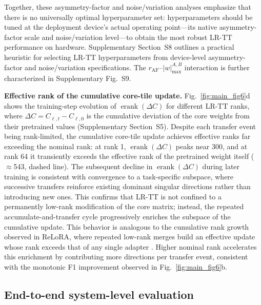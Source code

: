 \documentclass[fleqn,10pt]{wlscirep}
\newcommand{\erank}{\operatorname{erank}}
\begin{document}
Together, these asymmetry-factor and noise/variation analyses emphasize that there is no universally optimal hyperparameter set: hyperparameters should be tuned at the deployment device's actual operating point---its native asymmetry-factor scale and noise/variation level---to obtain the most robust LR-TT performance on hardware.
Supplementary Section~S8 outlines a practical heuristic for selecting LR-TT hyperparameters from device-level asymmetry-factor and noise/variation specifications.
The \(r_{\mathrm{AF}}\)--\(|w|_{\max}^{A,B}\) interaction is further characterized in Supplementary Fig.~S9.

\noindent
\textbf{Effective rank of the cumulative core-tile update.}
Fig.~\ref{fig:main_fig6}d shows the training-step evolution of \(\erank(\Delta C)\) for different LR-TT ranks, where \(\Delta C = C_{\ell,t}-C_{\ell,0}\) is the cumulative deviation of the core weights from their pretrained values (Supplementary Section~S5). Despite each transfer event being rank-limited, the cumulative core-tile update achieves effective ranks far exceeding the nominal rank: at rank 1, \(\erank(\Delta C)\) peaks near 300, and at rank 64 it transiently exceeds the effective rank of the pretrained weight itself (\(\approx\)543, dashed line). The subsequent decline in \(\erank(\Delta C)\) during later training is consistent with convergence to a task-specific subspace, where successive transfers reinforce existing dominant singular directions rather than introducing new ones. This confirms that LR-TT is not confined to a permanently low-rank modification of the core matrix; instead, the repeated accumulate-and-transfer cycle progressively enriches the subspace of the cumulative update. This behavior is analogous to the cumulative rank growth observed in ReLoRA, where repeated low-rank merges build an effective update whose rank exceeds that of any single adapter \cite{lialin2023relora}. Higher nominal rank accelerates this enrichment by contributing more directions per transfer event, consistent with the monotonic F1 improvement observed in Fig.~\ref{fig:main_fig6}b.


\subsection{End-to-end system-level evaluation}
\label{subsec:PPA_transformer}
\end{document}
